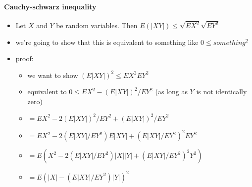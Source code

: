 \paragraph{Cauchy-schwarz inequality}
\begin{itemize}
\item Let $X$ and $Y$ be random variables.  Then $E (|X Y|) \leq
          \sqrt{E X^2} \sqrt{E Y^2}$
\item we're going to show that this is equivalent to something
          like $0 \leq something^2$
\item proof:
\begin{itemize}
\item we want to show $(E |XY|)^2 \leq E X^2 E Y^2$
\item equivalent to $0 \leq E X^2 - (E |X Y|)^2 / E Y^2$ (as long
            as $Y$ is not identically zero)
\item $= E X^2 - 2 (E |XY|)^2/EY^2 + (E |XY|)^2/EY^2$
\item $= E X^2 - 2(E |XY| / E Y^2) E |XY| + (E |XY|/EY^2)^2 E Y^2$
\item $= E(X^2 - 2(E |XY| / E Y^2) |X| |Y| + (E |XY|/EY^2)^2 Y^2)$
\item $= E(|X| - (E |XY|/E Y^2) |Y|)^2$
\end{itemize}
\end{itemize}

